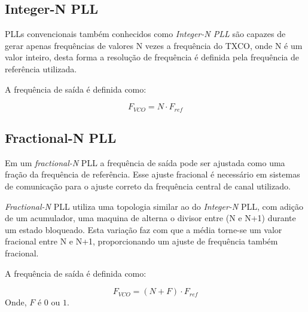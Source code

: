 \subsection{Integer-N PLL}

PLLs convencionais também conhecidos como \textit{Integer-N PLL} são capazes de gerar apenas frequências de valores N vezes a frequência do TXCO, onde N é um valor inteiro, desta forma a resolução de frequência é definida pela frequência de referência utilizada. 

A frequência de saída é definida como:

\begin{equation}
	F_{VCO} = N \cdot F_{ref}
	\label{eq:fvco_integer_PLL}
\end{equation}



\subsection{Fractional-N PLL}
Em um \textit{fractional-N} PLL a frequência de saída pode ser ajustada como uma fração da frequência de referência. Esse ajuste fracional é necessário em sistemas de comunicação para o ajuste correto da frequência central de canal utilizado. 

\textit{Fractional-N} PLL utiliza uma topologia similar ao do \textit{Integer-N} PLL, com adição de um acumulador, uma maquina de alterna o divisor entre (N e N+1) durante um estado bloqueado. Esta variação faz com que a média torne-se um valor fracional entre N e N+1, proporcionando um ajuste de frequência também fracional. 

A frequência de saída é definida como:

\begin{equation}
	F_{VCO} = (N + F) \cdot F_{ref}
	\label{eq:fvco_fractional_PLL}
\end{equation}
Onde, $F$ é $0$ ou $1$. 

